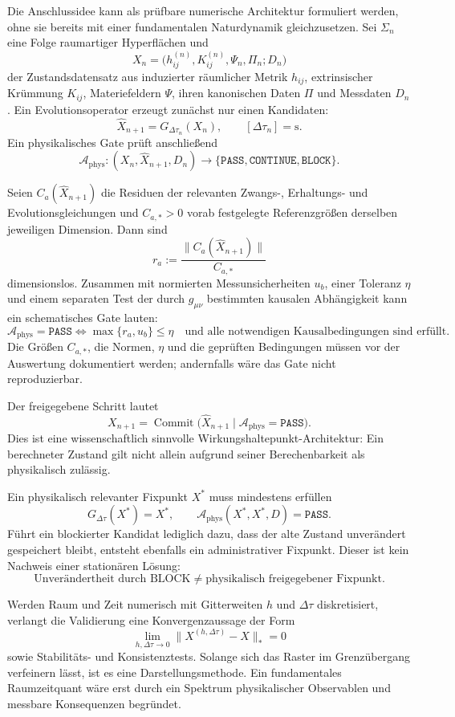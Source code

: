 \documentclass[11pt,a4paper]{article}
\theoremstyle{remark}
\newcommand{\PASS}{\texttt{PASS}}
\newcommand{\CONTINUE}{\texttt{CONTINUE}}
\newcommand{\BLOCK}{\texttt{BLOCK}}
\begin{document}
Die Anschlussidee kann als prüfbare numerische Architektur formuliert werden,
ohne sie bereits mit einer fundamentalen Naturdynamik gleichzusetzen. Sei
\(\Sigma_n\) eine Folge raumartiger Hyperflächen und
\[
  X_n=\bigl(h_{ij}^{(n)},K_{ij}^{(n)},\Psi_n,\Pi_n;D_n\bigr)
\]
der Zustandsdatensatz aus induzierter räumlicher Metrik \(h_{ij}\),
extrinsischer Krümmung \(K_{ij}\), Materiefeldern \(\Psi\), ihren kanonischen
Daten \(\Pi\) und Messdaten \(D_n\). Ein Evolutionsoperator erzeugt zunächst
nur einen Kandidaten:
\[
  \widehat X_{n+1}=G_{\Delta\tau_n}(X_n),
  \qquad [\Delta\tau_n]=\mathrm s.
\]
Ein physikalisches Gate prüft anschließend
\[
  \mathcal A_{\mathrm{phys}}:
  (X_n,\widehat X_{n+1},D_n)
  \longrightarrow\{\PASS,\CONTINUE,\BLOCK\}.
\]

Seien \(C_a(\widehat X_{n+1})\) die Residuen der relevanten
Zwangs-, Erhaltungs- und Evolutionsgleichungen und \(C_{a,*}>0\) vorab
festgelegte Referenzgrößen derselben jeweiligen Dimension. Dann sind
\[
  r_a:=\frac{\lVert C_a(\widehat X_{n+1})\rVert}{C_{a,*}}
\]
dimensionslos. Zusammen mit normierten Messunsicherheiten \(u_b\), einer
Toleranz \(\eta\) und einem separaten Test der durch \(g_{\mu\nu}\)
bestimmten kausalen Abhängigkeit kann ein schematisches Gate lauten:
\[
\mathcal A_{\mathrm{phys}}=\PASS
\Longleftrightarrow
\max\{r_a,u_b\}\le\eta
\quad\text{und alle notwendigen Kausalbedingungen sind erfüllt}.
\]
Die Größen \(C_{a,*}\), die Normen, \(\eta\) und die geprüften Bedingungen
müssen vor der Auswertung dokumentiert werden; andernfalls wäre das Gate
nicht reproduzierbar.

Der freigegebene Schritt lautet
\[
  X_{n+1}=\operatorname{Commit}
  \bigl(\widehat X_{n+1}\mid
  \mathcal A_{\mathrm{phys}}=\PASS\bigr).
\]
Dies ist eine wissenschaftlich sinnvolle Wirkungshaltepunkt-Architektur: Ein
berechneter Zustand gilt nicht allein aufgrund seiner Berechenbarkeit als
physikalisch zulässig.

Ein physikalisch relevanter Fixpunkt \(X^*\) muss mindestens erfüllen
\[
  G_{\Delta\tau}(X^*)=X^*,
  \qquad
  \mathcal A_{\mathrm{phys}}(X^*,X^*,D)=\PASS.
\]
Führt ein blockierter Kandidat lediglich dazu, dass der alte Zustand
unverändert gespeichert bleibt, entsteht ebenfalls ein administrativer
Fixpunkt. Dieser ist kein Nachweis einer stationären Lösung:
\[
  \boxed{
  \text{Unverändertheit durch BLOCK}
  \neq
  \text{physikalisch freigegebener Fixpunkt}.}
\]

Werden Raum und Zeit numerisch mit Gitterweiten \(h\) und \(\Delta\tau\)
diskretisiert, verlangt die Validierung eine Konvergenzaussage der Form
\[
  \lim_{h,\Delta\tau\to0}
  \bigl\|X^{(h,\Delta\tau)}-X\bigr\|_*=0
\]
sowie Stabilitäts- und Konsistenztests. Solange sich das Raster im
Grenzübergang verfeinern lässt, ist es eine Darstellungsmethode. Ein
fundamentales Raumzeitquant wäre erst durch ein Spektrum physikalischer
Observablen und messbare Konsequenzen begründet.
\end{document}

